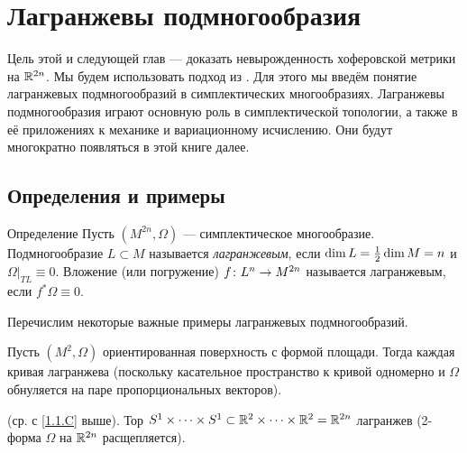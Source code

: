 \chapter{Лагранжевы подмногообразия}\label{chap:3}

Цель этой и следующей глав --- доказать невырожденность хоферовской метрики на $\mathbb{R}^{2n}$.
Мы будем использовать подход из \cite{P1}.
Для этого мы введём понятие лагранжевых подмногообразий в симплектических многообразиях.
Лагранжевы подмногообразия играют основную роль в симплектической топологии, а также в её приложениях к механике и вариационному исчислению.
Они будут многократно появляться в этой книге далее.

\section{Определения и примеры}\label{3.1}

\begin{ex*}{Определение}
Пусть $(M^{2n}, \Omega)$ --- симплектическое многообразие.
Подмногообразие $L \subset M$ называется \emph{лагранжевым}, если $\dim L \z= \tfrac12 \dim M = n$ и $\Omega|_{TL} \equiv 0$.
Вложение (или погружение) $f\colon L^n \z\to M^{2n}$ называется лагранжевым, если $f^\ast \Omega \equiv 0$.
\end{ex*}

Перечислим некоторые важные примеры лагранжевых подмногообразий.

\begin{ex}{}\label{3.1.A} 
Пусть $(M^2, \Omega)$ ориентированная поверхность с формой площади.
Тогда каждая кривая лагранжева (поскольку касательное пространство к кривой одномерно и $\Omega$ обнуляется на паре пропорциональных векторов).
\end{ex}


\begin{ex}{}\label{3.1.B} (ср. с \ref{1.1.C} выше).
Тор $S^1 \times\dots\times S^1
\subset 
\mathbb{R}^2\times\dots\times \mathbb{R}^2 
= 
\mathbb{R}^{2n}$ лагранжев (2-форма $\Omega$ на $\mathbb{R}^{2n}$ расщепляется).
\end{ex}


